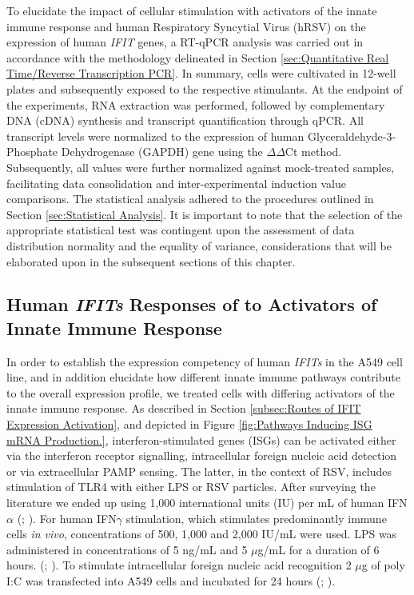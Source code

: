 To elucidate the impact of cellular stimulation with activators of the innate immune response and human Respiratory Syncytial Virus (hRSV) on the expression of human \textit{IFIT} genes, a RT-qPCR analysis was carried out in accordance with the methodology delineated in Section \ref{sec:Quantitative Real Time/Reverse Transcription PCR}. In summary, cells were cultivated in 12-well plates and subsequently exposed to the respective stimulants. At the endpoint of the experiments, RNA extraction was performed, followed by complementary DNA (cDNA) synthesis and transcript quantification through qPCR. All transcript levels were normalized to the expression of human Glyceraldehyde-3-Phosphate Dehydrogenase (GAPDH) gene using the \(\Delta\)\(\Delta\)Ct method. Subsequently, all values were further normalized against mock-treated samples, facilitating data consolidation and inter-experimental induction value comparisons. The statistical analysis adhered to the procedures outlined in Section \ref{sec:Statistical Analysis}. It is important to note that the selection of the appropriate statistical test was contingent upon the assessment of data distribution normality and the equality of variance, considerations that will be elaborated upon in the subsequent sections of this chapter.

\subsection{Human \textit{IFITs} Responses of to Activators of Innate Immune Response} \label{subsec:Human IFIT Responses to Activators of Innate Immune Response}
In order to establish the expression competency of human \textit{IFITs} in the A549 cell line, and in addition elucidate how different innate immune pathways contribute to the overall expression profile, we treated cells with differing activators of the innate immune response. As described in Section \ref{subsec:Routes of IFIT Expression Activation}, and depicted in Figure \ref{fig:Pathways Inducing ISG mRNA Production.},  interferon-stimulated genes (ISGs) can be activated either via the interferon receptor signalling, intracellular foreign nucleic acid detection or via extracellular PAMP sensing. The latter, in the context of RSV, includes stimulation of TLR4 with either LPS or RSV particles. After surveying the literature we ended up using 1,000 international units (IU) per mL of human IFN\(\alpha\) (\cite{Terenzi2006DistinctISG56}; \cite{Santhakumar2018ChickenViruses}). For human IFN\(\gamma\) stimulation, which stimulates predominantly immune cells \textit{in vivo}, concentrations of 500, 1,000 and 2,000 IU/mL were used. LPS was administered in concentrations of 5 ng/mL and 5 \(\mu\)g/mL for a duration of 6 hours. (\cite{Mears2019Ifit1Cells}; \cite{Zhang2019GrouperResponse}). To stimulate intracellular foreign nucleic acid recognition 2 \(\mu\)g of poly I:C was transfected into A549 cells and incubated for 24 hours (\cite{Mears2019Ifit1Cells}; \cite{Palchetti2015TransfectedCells}).

